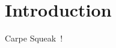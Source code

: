 
\chapter{Introduction}
\label{cha:introduction}

Carpe Squeak~\cite{thiede2023squeak,thiede2023object,thiede2023time,thiede2024bringing,thiede2024talking}!
